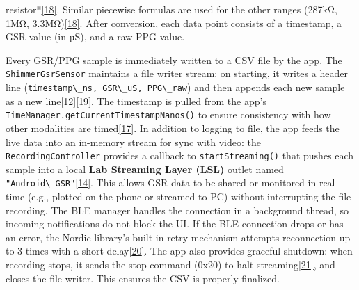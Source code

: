\documentclass[12pt,a4paper]{article}
\begin{document}
resistor*\href{https://github.com/buccancs/GSR-Dual-Video-System/blob/05ae360cb7b4ae7c7861f72deb235ad64a74b38e/android/app/src/main/java/com/yourcompany/gsrcapture/hardware/ShimmerGsrSensor.kt\#L94-L101}{{[}18{]}}. Similar piecewise formulas are used for the other ranges (287kΩ, 1MΩ, 3.3MΩ)\href{https://github.com/buccancs/GSR-Dual-Video-System/blob/05ae360cb7b4ae7c7861f72deb235ad64a74b38e/android/app/src/main/java/com/yourcompany/gsrcapture/hardware/ShimmerGsrSensor.kt\#L94-L101}{{[}18{]}}. After conversion, each data point consists of a timestamp, a GSR value (in µS), and a raw PPG value.

Every GSR/PPG sample is immediately written to a CSV file by the app. The \passthrough{\lstinline!ShimmerGsrSensor!} maintains a file writer stream; on starting, it writes a header line (\passthrough{\lstinline!timestamp\_ns, GSR\_uS, PPG\_raw!}) and then appends each new sample as a new line\href{https://github.com/buccancs/GSR-Dual-Video-System/blob/05ae360cb7b4ae7c7861f72deb235ad64a74b38e/android/app/src/main/java/com/yourcompany/gsrcapture/hardware/ShimmerGsrSensor.kt\#L52-L60}{{[}12{]}}\href{https://github.com/buccancs/GSR-Dual-Video-System/blob/05ae360cb7b4ae7c7861f72deb235ad64a74b38e/android/app/src/main/java/com/yourcompany/gsrcapture/hardware/ShimmerGsrSensor.kt\#L103-L111}{{[}19{]}}. The timestamp is pulled from the app's \passthrough{\lstinline!TimeManager.getCurrentTimestampNanos()!} to ensure consistency with how other modalities are timed\href{https://github.com/buccancs/GSR-Dual-Video-System/blob/05ae360cb7b4ae7c7861f72deb235ad64a74b38e/android/app/src/main/java/com/yourcompany/gsrcapture/hardware/ShimmerGsrSensor.kt\#L86-L94}{{[}17{]}}. In addition to logging to file, the app feeds the live data into an in-memory stream for sync with video: the \passthrough{\lstinline!RecordingController!} provides a callback to \passthrough{\lstinline!startStreaming()!} that pushes each sample into a local \textbf{Lab Streaming Layer (LSL)} outlet named \passthrough{\lstinline!"Android\_GSR"!}\href{https://github.com/buccancs/GSR-Dual-Video-System/blob/05ae360cb7b4ae7c7861f72deb235ad64a74b38e/android/app/src/main/java/com/yourcompany/gsrcapture/controller/RecordingController.kt\#L39-L47}{{[}14{]}}. This allows GSR data to be shared or monitored in real time (e.g., plotted on the phone or streamed to PC) without interrupting the file recording. The BLE manager handles the connection in a background thread, so incoming notifications do not block the UI. If the BLE connection drops or has an error, the Nordic library's built-in retry mechanism attempts reconnection up to 3 times with a short delay\href{https://github.com/buccancs/GSR-Dual-Video-System/blob/05ae360cb7b4ae7c7861f72deb235ad64a74b38e/android/app/src/main/java/com/yourcompany/gsrcapture/hardware/ShimmerGsrSensor.kt\#L39-L45}{{[}20{]}}. The app also provides graceful shutdown: when recording stops, it sends the stop command (0x20) to halt streaming\href{https://github.com/buccancs/GSR-Dual-Video-System/blob/05ae360cb7b4ae7c7861f72deb235ad64a74b38e/android/app/src/main/java/com/yourcompany/gsrcapture/hardware/ShimmerGsrSensor.kt\#L61-L65}{{[}21{]}}, and closes the file writer. This ensures the CSV is properly finalized.
\end{document}

